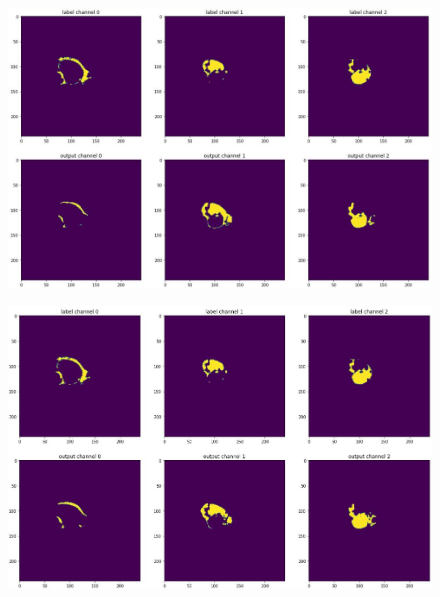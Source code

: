 \begin{figure}
\includegraphics[width=\linewidth]{./images/nnunetresult.jpg}
\label{fig:resultnnunet}
\end{figure}

\begin{figure}
\includegraphics[width=\linewidth]{./images/resultsegresnet.jpg}
\label{fig:resultsegresnet}
\end{figure}

